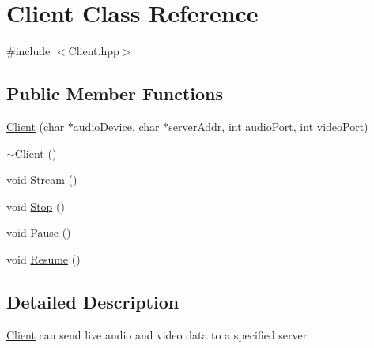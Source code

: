 \hypertarget{classClient}{\section{Client Class Reference}
\label{classClient}
}


{\ttfamily \#include $<$Client.\+hpp$>$}

\subsection*{Public Member Functions}
\begin{DoxyCompactItemize}
\item 
\hyperlink{classClient_a19bf7c28f8209a472d700cdc6278e84e}{Client} (char $\ast$audio\+Device, char $\ast$server\+Addr, int audio\+Port, int video\+Port)
\item 
\hyperlink{classClient_a840e519ca781888cbd54181572ebe3a7}{$\sim$\+Client} ()
\item 
void \hyperlink{classClient_a6f12baa525b0c93000569172ff6ae3fa}{Stream} ()
\item 
void \hyperlink{classClient_a1dd85fbf24f35fd0c08608b34f54e4b2}{Stop} ()
\item 
void \hyperlink{classClient_ad7191a4668bb5cee1c9475ff6c8b60d8}{Pause} ()
\item 
void \hyperlink{classClient_a0d0f4a1317a31aca618d318c49648dd4}{Resume} ()
\end{DoxyCompactItemize}


\subsection{Detailed Description}
\hyperlink{classClient}{Client} can send live audio and video data to a specified server 


